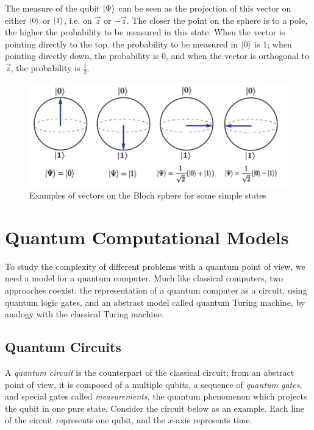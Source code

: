 \documentclass[12pt,a4paper]{article}
\theoremstyle{plain}
\theoremstyle{definition}
\DeclarePairedDelimiter\ket{\lvert}{\rangle}
\begin{document}
The measure of the qubit $\ket{\Psi}$ can be seen as the projection of this vector on either $\ket{0}$ or $\ket{1}$, i.e. on $\vec{z}$ or $-\vec{z}$. The closer the point on the sphere is to a pole, the higher the probability to be measured in this state. When the vector is pointing directly to the top, the probability to be measured in $\ket{0}$ is $1$; when pointing directly down, the probability is $0$, and when the vector is orthogonal to $\vec{z}$, the probability is $\frac{1}{2}$.

\begin{figure}[!ht]
    \centering
    \includegraphics*[scale=0.4]{bloch-examples.png}
    \caption{Examples of vectors on the Bloch sphere for some simple states}
\end{figure}

\section{Quantum Computational Models}
To study the complexity of different problems with a quantum point of view, we need a model for a quantum computer. Much like classical computers, two approaches coexist: the representation of a quantum computer as a circuit, using quantum logic gates, and an abstract model called quantum Turing machine, by analogy with the classical Turing machine.

\subsection{Quantum Circuits}
A \emph{quantum circuit} is the counterpart of the classical circuit; from an abstract point of view, it is composed of a multiple qubits, a sequence of \emph{quantum gates}, and special gates called \emph{measurements}, the quantum phenomenon which projects the qubit in one pure state. Consider the circuit below as an example. Each line of the circuit represents one qubit, and the $x$-axis represents time.
\end{document}
